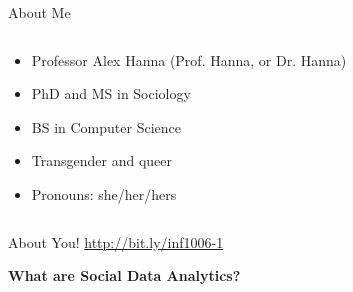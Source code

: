 \documentclass{beamer}
\begin{document}
\begin{frame}{About Me}
  \begin{columns}
    \begin{column}{0.5\textwidth}
        \begin{itemize}[<+->]
          \item Professor Alex Hanna (Prof. Hanna, or Dr. Hanna)
          \item PhD and MS in Sociology
          \item BS in Computer Science
          \item Transgender and queer
          \item Pronouns: she/her/hers
        \end{itemize}
    \end{column}
    \begin{column}{0.5\textwidth}
    \end{column}
  \end{columns}
\end{frame}

\begin{frame}{About You!}
  \centering
  \url{http://bit.ly/inf1006-1}
\end{frame}

\begin{frame}[plain]
  \begin{center}
    \bf \LARGE What are Social Data Analytics?
  \end{center}
\end{frame}
\end{document}
